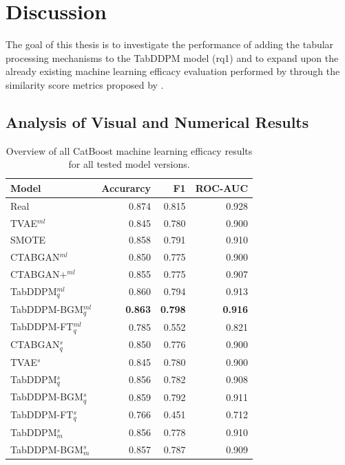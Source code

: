 \newpage
\section{Discussion}
\label{ch:results-discussion}
The goal of this thesis is to investigate the performance of adding the tabular processing mechanisms to the TabDDPM model (\gls{rq}1) and 
to expand upon the already existing machine learning efficacy evaluation performed by \cite{kotelnikov2022TabDDPMModellingTabular} through the similarity score metrics proposed by \cite{chundawat2022UniversalMetricRobust}.

\subsection*{Analysis of Visual and Numerical Results}

\begin{table}[h]
	\centering
	\begin{tabular}{lrrr}
		\toprule
		\textbf{Model}       & \textbf{Accurarcy} & \textbf{F1}     & \textbf{ROC-AUC} \\
		\midrule
		Real                 & 0.874              & 0.815           & 0.928            \\
		TVAE$^{ml}$          & 0.845              & 0.780           & 0.900            \\
		SMOTE                & 0.858              & 0.791           & 0.910            \\
		CTABGAN$^{ml}$       & 0.850              & 0.775           & 0.900            \\
		CTABGAN+$^{ml}$      & 0.855              & 0.775           & 0.907            \\
		TabDDPM$^{ml}_q$     & 0.860              & 0.794           & 0.913            \\
		TabDDPM-BGM$^{ml}_q$ & \textbf{0.863}     & \textbf{0.798} & \textbf{0.916}   \\
		TabDDPM-FT$^{ml}_q$  & 0.785              & 0.552           & 0.821            \\
		CTABGAN$^{s}_q$      & 0.850              & 0.776           & 0.900            \\
		TVAE$^{s}$           & 0.845              & 0.780           & 0.900            \\
		TabDDPM$^{s}_q$      & 0.856              & 0.782           & 0.908            \\
		TabDDPM-BGM$^{s}_q$  & 0.859              & 0.792           & 0.911            \\
		TabDDPM-FT$^{s}_q$   & 0.766              & 0.451           & 0.712            \\
		TabDDPM$^{s}_m$      & 0.856              & 0.778           & 0.910            \\
		TabDDPM-BGM$^{s}_m$  & 0.857              & 0.787           & 0.909            \\
		\bottomrule
	\end{tabular}
	\caption[Overview all ML-Efficacy results]{Overview of all CatBoost machine learning efficacy results for all tested model versions.}
	\label{tab:ml-all}
\end{table}


